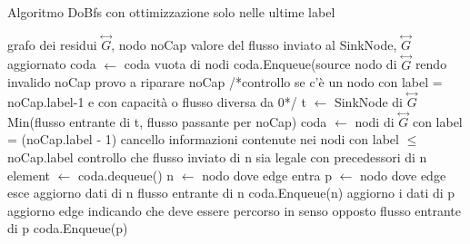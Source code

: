 \documentclass{article}
\begin{document}
    
    \begin{algorithm}
    \caption{Algoritmo DoBfs con ottimizzazione solo nelle ultime label}
    \begin{algorithmic}
    \REQUIRE grafo dei residui $\overset{\leftrightarrow}{G}$, nodo noCap
    \ENSURE valore del flusso inviato al SinkNode, $\overset{\leftrightarrow}{G}$ aggiornato
    \STATE coda $\leftarrow$ coda vuota di nodi
    \STATE coda.Enqueue(source nodo di $\overset{\leftrightarrow}{G}$
    \ELSE
    \STATE rendo invalido noCap
    \STATE provo a riparare noCap /*controllo se c'è un nodo con label = noCap.label-1 e con capacità o flusso diversa da 0*/
    \STATE t $\leftarrow$ SinkNode di $\overset{\leftrightarrow}{G}$
    \RETURN Min(flusso entrante di t, flusso passante per noCap)
    \ENDIF
    \STATE coda $\leftarrow$ nodi di $\overset{\leftrightarrow}{G}$ con label = (noCap.label - 1)
    \STATE cancello informazioni contenute nei nodi con label $\leq$ noCap.label
    \STATE controllo che flusso inviato di n sia legale con precedessori di n
    \ENDFOR
    \ENDIF
    \STATE element  $\leftarrow$ coda.dequeue()
    \STATE n $\leftarrow$ nodo dove edge entra
    \STATE p $\leftarrow$ nodo dove edge esce
    \STATE aggiorno dati di n 
    \RETURN flusso entrante di n
    \ELSE
    \STATE coda.Enqueue(n)
    \ENDIF
    \STATE aggiorno i dati di p
    \STATE aggiorno edge indicando che deve essere percorso in senso opposto
    \RETURN flusso entrante di p
    \ELSE
    \STATE coda.Enqueue(p)
    \ENDIF
    \ENDIF
    \ENDIF
    \ENDIF
    \ENDFOR
    \ENDWHILE
    \end{algorithmic}
    \end{algorithm} 
\end{document}
